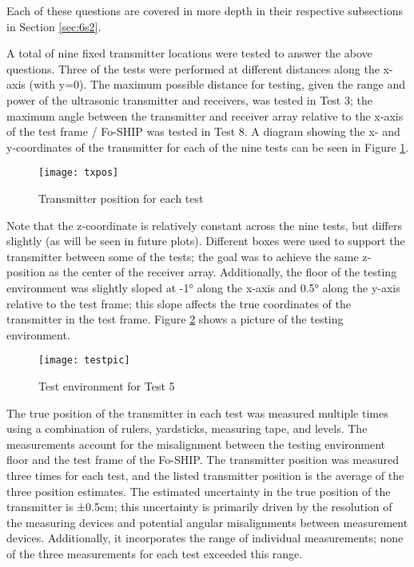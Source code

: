 \documentclass[12pt,a4paper]{report}
\begin{document}
Each of these questions are covered in more depth in their respective subsections in Section \ref{sec:6s2}.

A total of nine fixed transmitter locations were tested to answer the above questions. Three of the tests were performed at different distances along the x-axis (with y=0). The maximum possible distance for testing, given the range and power of the ultrasonic transmitter and receivers, was tested in Test 3; the maximum angle between the transmitter and receiver array relative to the x-axis of the test frame / Fo-SHIP was tested in Test 8. A diagram showing the x- and y-coordinates of the transmitter for each of the nine tests can be seen in Figure \ref{fig:txpos}.

\begin{figure}[htbp]
	\centering
	\texttt{[image: txpos]}
	\caption{Transmitter position for each test}
	\label{fig:txpos}
\end{figure}

Note that the z-coordinate is relatively constant across the nine tests, but differs slightly (as will be seen in future plots). Different boxes were used to support the transmitter between some of the tests; the goal was to achieve the same z-position as the center of the receiver array. Additionally, the floor of the testing environment was slightly sloped at -1° along the x-axis and 0.5° along the y-axis relative to the test frame; this slope affects the true coordinates of the transmitter in the test frame. Figure \ref{fig:testpic} shows a picture of the testing environment.

\begin{figure}[htbp]
	\centering
	\texttt{[image: testpic]}
	\caption{Test environment for Test 5}
	\label{fig:testpic}
\end{figure}

The true position of the transmitter in each test was measured multiple times using a combination of rulers, yardsticks, measuring tape, and levels. The measurements account for the misalignment between the testing environment floor and the test frame of the Fo-SHIP. The transmitter position was measured three times for each test, and the listed transmitter position is the average of the three position estimates. The estimated uncertainty in the true position of the transmitter is ±0.5cm; this uncertainty is primarily driven by the resolution of the measuring devices and potential angular misalignments between measurement devices. Additionally, it incorporates the range of individual measurements; none of the three measurements for each test exceeded this range.
\end{document}
